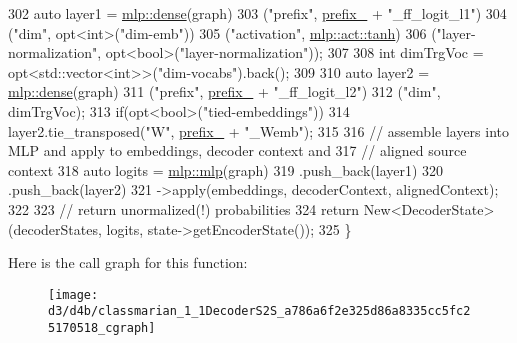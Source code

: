 \begin{DoxyCode}
302     \textcolor{keyword}{auto} layer1 = \hyperlink{namespacemarian_1_1mlp_a8c25b1e343bf78e66cd9e33e607efeb5}{mlp::dense}(graph)
303                   (\textcolor{stringliteral}{"prefix"}, \hyperlink{classmarian_1_1DecoderBase_a043a90801b6bda9a45e309607136e947}{prefix\_} + \textcolor{stringliteral}{"\_ff\_logit\_l1"})
304                   (\textcolor{stringliteral}{"dim"}, opt<int>(\textcolor{stringliteral}{"dim-emb"}))
305                   (\textcolor{stringliteral}{"activation"}, \hyperlink{namespacemarian_1_1mlp_ac16d27a877d16d7394f2057aee439d72a5c0dbba3a6ee4ac0eb26cfee75ccb8b4}{mlp::act::tanh})
306                   (\textcolor{stringliteral}{"layer-normalization"}, opt<bool>(\textcolor{stringliteral}{"layer-normalization"}));
307 
308     \textcolor{keywordtype}{int} dimTrgVoc = opt<std::vector<int>>(\textcolor{stringliteral}{"dim-vocabs"}).back();
309 
310     \textcolor{keyword}{auto} layer2 = \hyperlink{namespacemarian_1_1mlp_a8c25b1e343bf78e66cd9e33e607efeb5}{mlp::dense}(graph)
311                   (\textcolor{stringliteral}{"prefix"}, \hyperlink{classmarian_1_1DecoderBase_a043a90801b6bda9a45e309607136e947}{prefix\_} + \textcolor{stringliteral}{"\_ff\_logit\_l2"})
312                   (\textcolor{stringliteral}{"dim"}, dimTrgVoc);
313     \textcolor{keywordflow}{if}(opt<bool>(\textcolor{stringliteral}{"tied-embeddings"}))
314       layer2.tie\_transposed(\textcolor{stringliteral}{"W"}, \hyperlink{classmarian_1_1DecoderBase_a043a90801b6bda9a45e309607136e947}{prefix\_} + \textcolor{stringliteral}{"\_Wemb"});
315 
316     \textcolor{comment}{// assemble layers into MLP and apply to embeddings, decoder context and}
317     \textcolor{comment}{// aligned source context}
318     \textcolor{keyword}{auto} logits = \hyperlink{namespacemarian_1_1mlp_a4d0fe240d31bdc33bcbdb5401de49e27}{mlp::mlp}(graph)
319                   .push\_back(layer1)
320                   .push\_back(layer2)
321                   ->apply(embeddings, decoderContext, alignedContext);
322 
323     \textcolor{comment}{// return unormalized(!) probabilities}
324     \textcolor{keywordflow}{return} New<DecoderState>(decoderStates, logits, state->getEncoderState());
325   \}
\end{DoxyCode}


Here is the call graph for this function\+:
\nopagebreak
\begin{figure}[H]
\begin{center}
\leavevmode
\texttt{[image: d3/d4b/classmarian\_1\_1DecoderS2S\_a786a6f2e325d86a8335cc5fc25170518\_cgraph]}
\end{center}
\end{figure}




